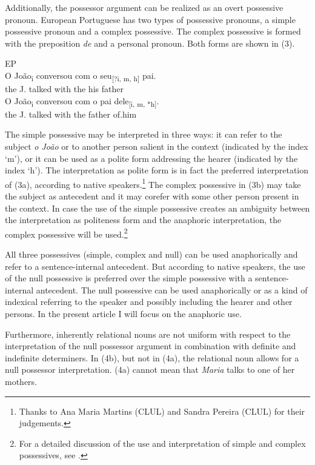 \documentclass[output=paper]{langsci/langscibook}
\begin{document}
Additionally, the possessor argument can be realized as an overt possessive pronoun. European Portuguese has two types of possessive pronouns, a simple possessive pronoun and a complex possessive. The complex possessive is formed with the preposition \textit{de} and a personal pronoun. Both forms are shown in (3).

\ea%
    EP\label{ex:wein:3}\\
    \ea
    \gll O João\textsubscript{i} conversou com o seu\textsubscript{[?i, m, h]} pai.  \\
         the J. talked with the his father\\
    \ex
    \gll O João\textsubscript{i} conversou com o   pai   dele\textsubscript{[i, m, *h]}.\\
         the J. talked with the father of.him\\
    \z
\z

The simple possessive may be interpreted in three ways: it can refer to the subject \textit{o João} or to another person salient in the context (indicated by the index ‘m’), or it can be used as a polite form addressing the hearer (indicated by the index ‘h’). The interpretation as polite form is in fact the preferred interpretation of (3a), according to native speakers.\footnote{Thanks to Ana Maria Martins (CLUL) and Sandra Pereira (CLUL) for their judgements.} The complex possessive in (3b) may take the subject as antecedent and it may corefer with some other person present in the context. In case the use of the simple possessive creates an ambiguity between the interpretation as politeness form and the anaphoric interpretation, the complex possessive will be used.\footnote{For a detailed discussion of the use and interpretation of simple and complex possessives, see \citet{Castro2005}.}

All three possessives (simple, complex and null) can be used anaphorically and refer to a sentence-internal antecedent. But according to native speakers, the use of the null possessive is preferred over the simple possessive with a sentence-internal antecedent. The null possessive can be used anaphorically or as a kind of indexical referring to the speaker and possibly including the hearer and other persons. In the present article I will focus on the anaphoric use.

Furthermore, inherently relational nouns are not uniform with respect to the interpretation of the null possessor argument in combination with definite and indefinite determiners. In (4b), but not in (4a), the relational noun allows for a null possessor interpretation. (4a) cannot mean that \textit{Maria} talks to one of her mothers.
\end{document}
